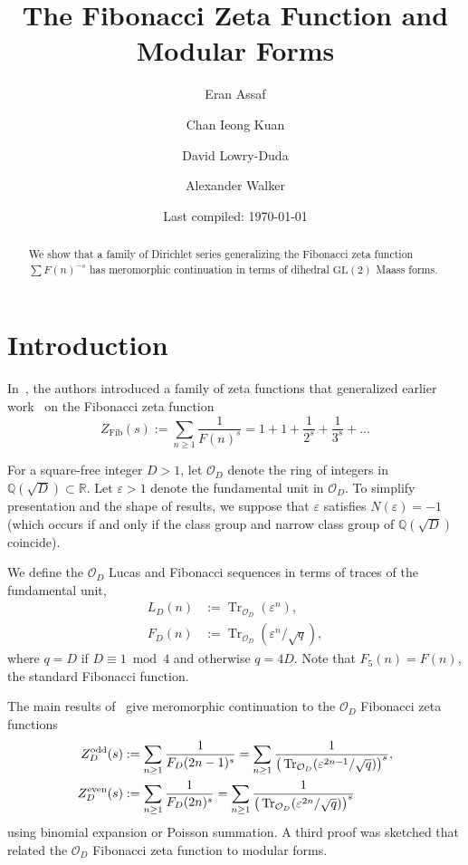 \documentclass[11pt,reqno,oneside]{amsart}
\title{The Fibonacci Zeta Function and Modular Forms}
\author[Assaf]{Eran Assaf}
\author[Kuan]{Chan Ieong Kuan}
\author[Lowry-Duda]{David Lowry-Duda}
\author[Walker]{Alexander Walker}
\date{Last compiled: \today}
\theoremstyle{plain}
\theoremstyle{definition}
\DeclareMathOperator{\Tr}{Tr}
\newcommand{\calO}{\mathcal{O}}
\newcommand{\Zeven}{Z_D^{\textup{even}}}
\newcommand{\Zodd}{Z_D^{\textup{odd}}}
\begin{document}
\begin{abstract}
  We show that a family of Dirichlet series generalizing the Fibonacci zeta function $\sum F(n)^{-s}$ has meromorphic
  continuation in terms of dihedral $\mathrm{GL}(2)$ Maass forms.
\end{abstract}

\maketitle

\section{Introduction}%
\label{sec:intro}


In~\cite{akldwFibonacciGeneral}, the authors introduced a family of zeta
functions that generalized earlier work~\cite{egami1999curious,
  navas2001fibonacci, kamano2013analytic}
on the Fibonacci zeta function
\begin{equation}
  Z_{\mathrm{Fib}}(s)
  :=
  \sum_{n \geq 1} \frac{1}{F(n)^s}
  =
  1 + 1 + \frac{1}{2^s} + \frac{1}{3^s} + \ldots
\end{equation}

For a square-free integer $D > 1$, let $\calO_D$ denote the
ring of integers in $\mathbb{Q}(\sqrt{D}) \subset \mathbb{R}$.
Let $\varepsilon > 1$ denote the fundamental unit in $\calO_D$.
To simplify presentation and the shape of results, we suppose that
$\varepsilon$ satisfies $N(\varepsilon) = -1$ (which occurs if and only if the
class group and narrow class group of $\mathbb{Q}(\sqrt{D})$ coincide).

We define the $\calO_D$ Lucas and Fibonacci sequences in terms of
traces of the fundamental unit,
\begin{align}
  L_{D}(n) & := \Tr_{\calO_D}(\varepsilon^n),            %
  \label{align:lucas_def}%
  \\
  F_{D}(n) & := \Tr_{\calO_D}(\varepsilon^n / \sqrt{q}), %
  \label{align:fib_def}%
\end{align}
where $q = D$ if $D \equiv 1 \bmod 4$ and otherwise $q = 4D$.
Note that $F_5(n) = F(n)$, the standard Fibonacci function.

The main results of~\cite{akldwFibonacciGeneral} give meromorphic continuation
to the $\mathcal{O}_D$ Fibonacci zeta functions
\begin{align}
  \Zodd(s)
   & :=
  \sum_{n \geq 1}
  \frac{1}{F_D(2n - 1)^s}
  =
  \sum_{n \geq 1}
  \frac{1}{\big(\Tr_{\calO_D}(\varepsilon^{2n - 1} / \sqrt{q}) \big)^s},
  \\
  \Zeven(s)
   & :=
  \sum_{n \geq 1}
  \frac{1}{F_D(2n)^s}
  =
  \sum_{n \geq 1}
  \frac{1}{\big(\Tr_{\calO_D}(\varepsilon^{2n} / \sqrt{q}) \big)^s}
\end{align}
using binomial expansion or Poisson summation.
A third proof was sketched that related the $\mathcal{O}_D$ Fibonacci zeta
function to modular forms.
\end{document}
